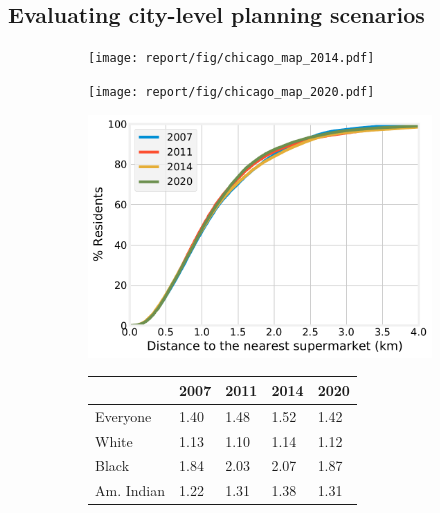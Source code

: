 \documentclass[final,3p,times,onecolumn,sort&compress]{elsarticle}
\begin{document}
\subsection{Evaluating city-level planning scenarios}


\begin{figure}[]
    \begin{subfigure}{0.5\textwidth}
        \texttt{[image: report/fig/chicago\_map\_2014.pdf]} 
    \end{subfigure}
    \begin{subfigure}{0.5\textwidth}
        \texttt{[image: report/fig/chicago\_map\_2020.pdf]}
    \end{subfigure}
    \begin{subfigure}{0.5\textwidth}
        \includegraphics[width=0.9\linewidth]{report/fig/chicago_CDF_H7X001.pdf} 
    \end{subfigure}
    \begin{subfigure}{0.5\textwidth}
        \begin{tabular}{lllll}
            \hline
            \textbf{}   & \textbf{2007} & \textbf{2011} & \textbf{2014} & \textbf{2020} \\ 
            \hline
            Everyone    & 1.40          & 1.48          & 1.52          & 1.42          \\
            White       & 1.13          & 1.10          & 1.14          & 1.12          \\
            Black       & 1.84          & 2.03          & 2.07          & 1.87          \\
            Am. Indian  & 1.22          & 1.31          & 1.38          & 1.31          \\

\end{tabular}
\end{subfigure}
\end{figure}
\end{document}
